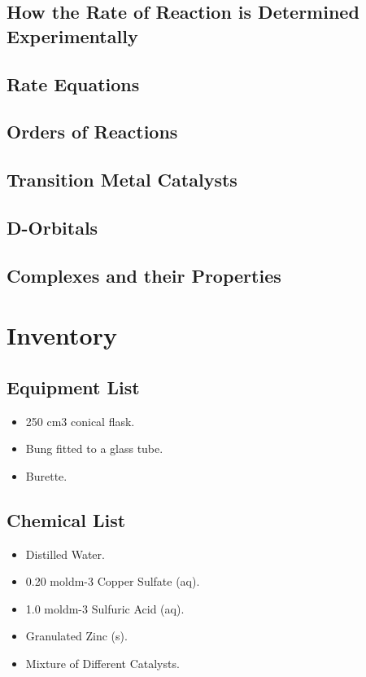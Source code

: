 	\subsection{How the Rate of Reaction is Determined Experimentally}



	\subsection{Rate Equations}



	\subsection{Orders of Reactions}



	\subsection{Transition Metal Catalysts}



	\subsection{D-Orbitals}



	\subsection{Complexes and their Properties}


\section{Inventory}

	\subsection{Equipment List}
\begin{itemize}
\item 250 cm3 conical flask.
\item Bung fitted to a glass tube.
\item Burette.
\end{itemize}

	\subsection{Chemical List}
\begin{itemize}
\item Distilled Water.
\item 0.20 moldm-3 Copper Sulfate (aq).
\item 1.0 moldm-3 Sulfuric Acid (aq).
\item Granulated Zinc (s).
\item Mixture of Different Catalysts.
\end{itemize}



